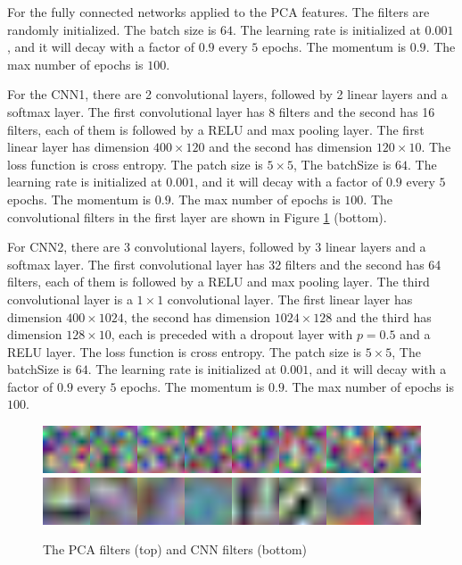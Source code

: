 \documentclass[10pt,twocolumn,letterpaper]{article}
\begin{document}
For the fully connected networks applied to the PCA features. The filters are randomly initialized. The batch size is $64$. The learning rate is initialized at $0.001$, and it will decay with a factor of $0.9$ every $5$ epochs. The momentum is $0.9$. The max number of epochs is $100$.

For the CNN1, there are 2 convolutional layers, followed by 2 linear layers and a softmax layer. The first convolutional layer has 8 filters and the second has 16 filters, each of them is followed by a RELU and max pooling layer. The first linear layer has dimension $400 \times 120$ and the second has dimension $120 \times 10$. The loss function is cross entropy. The patch size is $5 \times 5$, The batchSize is $64$. The learning rate is initialized at $0.001$, and it will decay with a factor of $0.9$ every $5$ epochs. The momentum is $0.9$. The max number of epochs is $100$. The convolutional filters in the first layer are shown in Figure \ref{Fig: filters} (bottom).

For CNN2, there are 3 convolutional layers, followed by 3 linear layers and a softmax layer. The first convolutional layer has 32 filters and the second has 64 filters, each of them is followed by a RELU and max pooling layer. The third convolutional layer is a $1\times 1$ convolutional layer. The first linear layer has dimension $400 \times 1024$, the second has dimension $1024 \times 128$ and the third has dimension $128 \times 10$, each is preceded with a dropout layer with $p=0.5$ and a RELU layer. The loss function is cross entropy. The patch size is $5 \times 5$, The batchSize is $64$. The learning rate is initialized at $0.001$, and it will decay with a factor of $0.9$ every $5$ epochs. The momentum is $0.9$. The max number of epochs is $100$. 


\begin{figure}
	\begin{center}
		\includegraphics[scale=1.7,width=15cm]{PCA_filters.png}
		\includegraphics[scale=1.7,width=15cm]{CNN_filters.png}
	\end{center}
	\caption{The PCA filters (top) and CNN filters (bottom)}\label{Fig: filters}
\end{figure}
\end{document}
